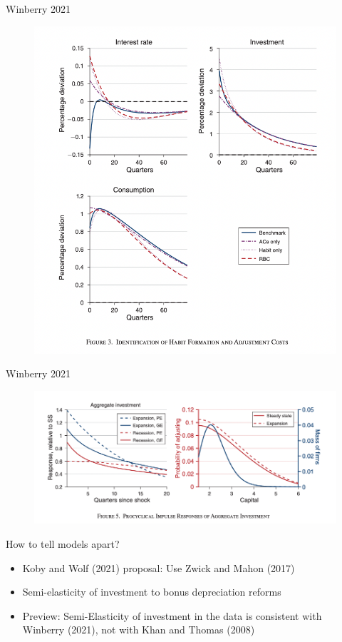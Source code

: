 \documentclass[english,xcolor=svgnames,aspectratio=169]{beamer}
\begin{document}
\begin{frame}{Winberry 2021}
\begin{figure}
\includegraphics[scale=0.25]{figures/w_4}
\end{figure}
\end{frame}


\begin{frame}{Winberry 2021}
\begin{figure}
\includegraphics[scale=0.45]{figures/w_3}
\end{figure}
\end{frame}



\begin{frame}{How to tell models apart?}
\begin{itemize}
\item Koby and Wolf (2021) proposal: Use Zwick and Mahon (2017)
\item Semi-elasticity of investment to bonus depreciation reforms
\item Preview: Semi-Elasticity of investment in the data is consistent with Winberry (2021), not with Khan and Thomas (2008)
\end{itemize}
\end{frame}
\end{document}
